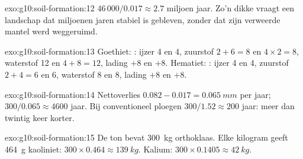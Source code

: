 \begin{solution}{exo:g10:soil-formation:12}
$46\,000/0.017 \approx 2.7$ miljoen jaar. Zo'n dikke  vraagt een
landschap dat miljoenen jaren stabiel is gebleven, zonder dat zijn verweerde
mantel werd weggeruimd.
\end{solution}

\begin{solution}{exo:g10:soil-formation:13}
Goethiet: : ijzer 4 en 4,
zuurstof $2 + 6 = 8$ en $4 \times 2 = 8$, waterstof 12 en $4 + 8 = 12$, lading
$+8$ en $+8$. Hematiet: : ijzer 4
en 4, zuurstof $2 + 4 = 6$ en 6, waterstof 8 en 8, lading $+8$ en $+8$.
\end{solution}

\begin{solution}{exo:g10:soil-formation:14}
Nettoverlies $0.082 - 0.017 = \qty{0.065}{mm}$ per jaar; $300/0.065 \approx 4600$
jaar. Bij conventioneel ploegen $300/1.52 \approx 200$ jaar: meer dan twintig
keer korter.
\end{solution}

\begin{solution}{exo:g10:soil-formation:15}
De ton bevat \qty{300}{kg} orthoklaas. Elke kilogram geeft \qty{464}{g}
kaoliniet: $300 \times 0.464 \approx \qty{139}{kg}$. Kalium:
$300 \times 0.1405 \approx \qty{42}{kg}$.
\end{solution}

